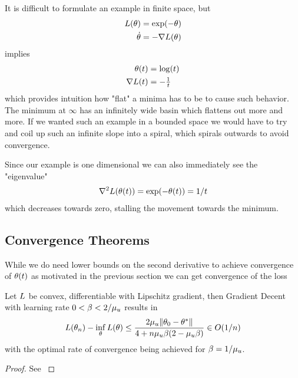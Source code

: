 It is difficult to formulate an example in finite space, but
%
\begin{align*}
	L(\theta) &= \exp(-\theta) \\
	\dot{\theta} &= -\nabla L(\theta)
\end{align*}
%
implies
%
\begin{align*}
	\theta(t) &= \log(t)\\
	\nabla L(t) &= -\tfrac1t
\end{align*}
%
which provides intuition how "flat" a minima has to be to cause such behavior.
The minimum at \(\infty\) has an infinitely wide basin which flattens out
more and more. If we wanted such an example in a bounded space we would have
to try and coil up such an infinite slope into a spiral, which spirals outwards
to avoid convergence.

Since our example is one dimensional we can also immediately see the "eigenvalue"
%
\begin{align*}
	\nabla^2 L(\theta(t)) = \exp(-\theta(t)) = 1/t
\end{align*}
%
which decreases towards zero, stalling the movement towards the minimum.

\subsection{Convergence Theorems}\label{sec: convex convergence theorems}

While we do need lower bounds on the second derivative to achieve convergence
of \(\theta(t)\) as motivated in the previous section we can get convergence
of the loss

\begin{theorem}
	Let \(L\) be convex, differentiable with Lipschitz gradient, then Gradient
	Decent with learning rate \(0 < \beta < 2/\mu_u\) results in
	\begin{align*}
		L(\theta_n) - \inf_\theta L(\theta)
		\le \frac{2\mu_u\|\theta_0 - \theta^*\|}{4 + n\mu_u\beta(2-\mu_u\beta)}
		\in O(1/n)
	\end{align*}
	with the optimal rate of convergence being achieved for \(\beta=1/\mu_u\).
\end{theorem}
\begin{proof}
	See \textcite[Theorem 2.1.14, Corollary
	2.1.2]{nesterovLecturesConvexOptimization2018}
\end{proof}

